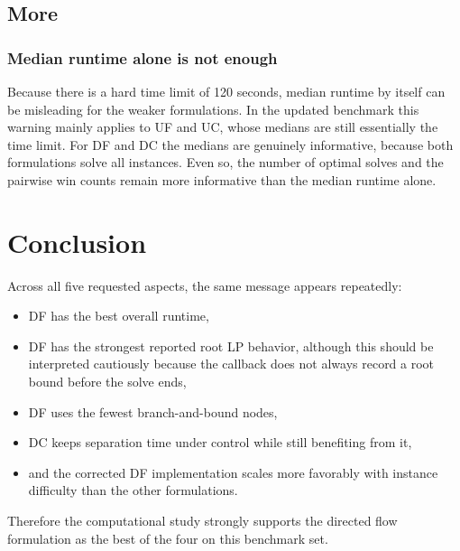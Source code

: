 \subsection{More}

\subsubsection*{Median runtime alone is not enough}

Because there is a hard time limit of 120 seconds, median runtime by itself can
be misleading for the weaker formulations. In the updated benchmark this warning
mainly applies to UF and UC, whose medians are still essentially the time
limit. For DF and DC the medians are genuinely informative, because both
formulations solve all instances. Even so, the number of optimal solves and the
pairwise win counts remain more informative than the median runtime alone.


\section{Conclusion}

Across all five requested aspects, the same message appears repeatedly:

\begin{itemize}
  \item DF has the best overall runtime,
  \item DF has the strongest reported root LP behavior, although this should be
  interpreted cautiously because the callback does not always record a root
  bound before the solve ends,
  \item DF uses the fewest branch-and-bound nodes,
  \item DC keeps separation time under control while still benefiting from it,
  \item and the corrected DF implementation scales more favorably with instance difficulty than
  the other formulations.
\end{itemize}

Therefore the computational study strongly supports the directed flow
formulation as the best of the four on this benchmark set.
